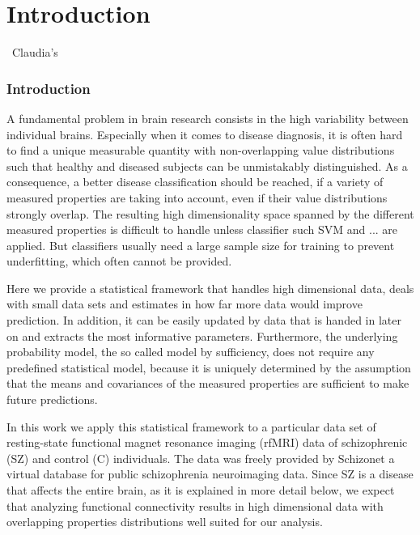 \documentclass[\ifafour a4paper,12pt,\else a5paper,10pt,\fi%
onecolumn,oneside,article,%
british%
]{memoir}
\theoremstyle{remark}
\theoremstyle{innote}
\renewcommand*{\|}{\mathpunct{|}}
\newcommand*{\puzzle}{\maltese}
\newcommand{\mynote}[1]{ {\footnotesize\color{notecolour}\puzzle\ #1} }
\theoremstyle{plain}
\begin{document}
\section{Introduction}
\label{sec:synopsis}

\mynote{Claudia's}

\subsubsection{Introduction}

A fundamental problem in brain research consists in the high variability
between individual brains. Especially when it comes to disease diagnosis,
it is often hard to find a unique measurable quantity with non-overlapping
value distributions  such that healthy and diseased subjects can
be unmistakably distinguished. As a consequence, a better disease
classification should be reached, if a variety of measured properties
are taking into account, even if their value distributions strongly
overlap. The resulting high dimensionality space spanned by the different
measured properties is difficult to handle unless classifier such
SVM and ... are applied. But classifiers usually need a large sample
size for training to prevent underfitting, which often cannot be provided.

Here we provide a statistical framework that handles high dimensional
data, deals with small data sets and estimates in how far more data
would improve prediction. In addition, it can be easily updated by
data that is handed in later on and extracts the most informative
parameters. Furthermore, the underlying probability model, the so
called model by sufficiency, does not require any predefined statistical
model, because it is uniquely determined by the assumption that the
means and covariances of the measured properties are sufficient to
make future predictions. 

In this work we apply this statistical framework to a particular data
set of resting-state functional magnet resonance imaging (rfMRI) data
of schizophrenic (SZ) and control (C) individuals. The data was freely
provided by Schizonet a virtual database for public schizophrenia
neuroimaging data. Since SZ is a disease that affects the entire brain,
as it is explained in more detail below, we expect that analyzing
functional connectivity results in high dimensional data with overlapping
properties distributions well suited for our analysis.
\end{document}
